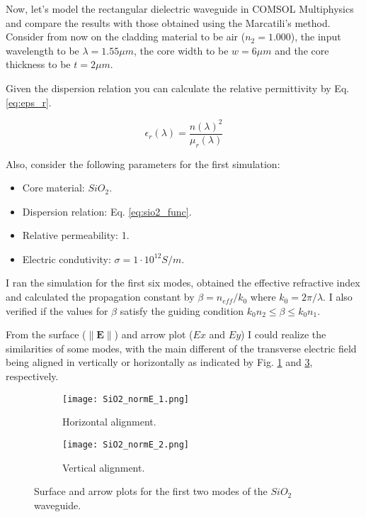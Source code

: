 \documentclass[a4paper,12pt]{article}
\begin{document}
Now, let's model the rectangular dielectric waveguide in COMSOL Multiphysics and compare the results with those obtained using the Marcatili's method. Consider from now on the cladding material to be air ($n_2 = 1.000$), the input wavelength to be $\lambda = 1.55 \mu m$, the core width to be $w = 6 \mu m$ and the core thickness to be $t = 2 \mu m$.

Given the dispersion relation you can calculate the relative permittivity by Eq. \eqref{eq:eps_r}.

\begin{equation}
    \epsilon_r(\lambda) = \frac{n(\lambda)^2}{\mu_r(\lambda)}
    \label{eq:eps_r}
\end{equation}

Also, consider the following parameters for the first simulation:
\begin{itemize}
    \item Core material: $SiO_2$.
    \item Dispersion relation: Eq. \eqref{eq:sio2_func}.
    \item Relative permeability: 1.
    \item Electric condutivity: $\sigma = 1 \cdot 10^{12}S/m$.
\end{itemize}

I ran the simulation for the first six modes, obtained the effective refractive index and calculated the propagation constant by $\beta = n_{eff}/k_0$ where $k_0 = 2\pi / \lambda$. I also verified if the values for $\beta$ satisfy the guiding condition $k_0 n_2 \leq \beta \leq k_0 n_1$. 

From the surface ($\| \mathbf{E} \|$) and arrow plot ($Ex$ and $Ey$) I could realize the similarities of some modes, with the main different of the transverse electric field being aligned in vertically or horizontally as indicated by Fig. \ref{fig:E_hor} and \ref{fig:E_ver}, respectively.

\begin{figure}[H]
    \centering
    \begin{subfigure}{0.45\textwidth}
        \centering
        \texttt{[image: SiO2\_normE\_1.png]}
        \caption{Horizontal alignment.}
        \label{fig:E_hor}
    \end{subfigure}
    \hfill
    \begin{subfigure}{0.45\textwidth}
        \centering
        \texttt{[image: SiO2\_normE\_2.png]}
        \caption{Vertical alignment.}
        \label{fig:E_ver}
    \end{subfigure}
    \caption{Surface and arrow plots for the first two modes of the $SiO_2$ waveguide.}
\end{figure}
\end{document}
